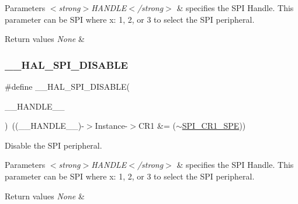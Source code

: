 \begin{DoxyParams}{Parameters}
{\em $<$strong$>$\+H\+A\+N\+D\+L\+E$<$/strong$>$} & specifies the S\+PI Handle. This parameter can be S\+PI where x\+: 1, 2, or 3 to select the S\+PI peripheral. \\
\hline
\end{DoxyParams}

\begin{DoxyRetVals}{Return values}
{\em None} & \\
\hline
\end{DoxyRetVals}
\mbox{\label{group___s_p_i___exported___macros_gaa10d88f87d16de53bd81dfb33bd56959}} 
\subsubsection{\texorpdfstring{\+\_\+\+\_\+\+H\+A\+L\+\_\+\+S\+P\+I\+\_\+\+D\+I\+S\+A\+B\+LE}{\_\_HAL\_SPI\_DISABLE}}
{\footnotesize\ttfamily \#define \+\_\+\+\_\+\+H\+A\+L\+\_\+\+S\+P\+I\+\_\+\+D\+I\+S\+A\+B\+LE(\begin{DoxyParamCaption}\item[{}]{\+\_\+\+\_\+\+H\+A\+N\+D\+L\+E\+\_\+\+\_\+ }\end{DoxyParamCaption})~((\+\_\+\+\_\+\+H\+A\+N\+D\+L\+E\+\_\+\+\_\+)-\/$>$Instance-\/$>$C\+R1 \&= ($\sim$\hyperlink{group___peripheral___registers___bits___definition_gac5a646d978d3b98eb7c6a5d95d75c3f9}{S\+P\+I\+\_\+\+C\+R1\+\_\+\+S\+PE}))}



Disable the S\+PI peripheral. 


\begin{DoxyParams}{Parameters}
{\em $<$strong$>$\+H\+A\+N\+D\+L\+E$<$/strong$>$} & specifies the S\+PI Handle. This parameter can be S\+PI where x\+: 1, 2, or 3 to select the S\+PI peripheral. \\
\hline
\end{DoxyParams}

\begin{DoxyRetVals}{Return values}
{\em None} & \\
\hline
\end{DoxyRetVals}
\mbox{\label{group___s_p_i___exported___macros_ga16d2d73c2b16004499ae8d492e71fd4e}} 
